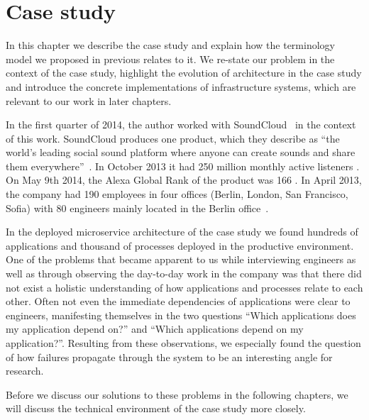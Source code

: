 
\chapter{Case study}
\label{chapter:case_study}

In this chapter we describe the case study and explain how the terminology model we proposed in previous  relates to it. We re-state our problem in the context of the case study, highlight the evolution of architecture in the case study and introduce the concrete implementations of infrastructure systems, which are relevant to our work in later chapters.

In the first quarter of 2014, the author worked with SoundCloud~\cite{soundcloud} in the context of this work. SoundCloud produces one product, which they describe as ``the world’s leading social sound platform where anyone can create sounds and share them everywhere''~\cite{soundcloudabout}. In October 2013 it had 250 million monthly active listeners \cite{soundcloudusers}. On May 9th 2014, the Alexa Global Rank of the product was 166 \cite{alexasoundcloud}. In April 2013, the company had 190 employees in four offices (Berlin, London, San Francisco, Sofia) with 80 engineers mainly located in the Berlin office~\cite{soundcloudAG}.

In the deployed microservice architecture of the case study we found hundreds of applications and thousand of processes deployed in the productive environment.
One of the problems that became apparent to us while interviewing engineers as well as through observing the day-to-day work in the company was that there did not exist a holistic understanding of how applications and processes relate to each other. Often not even the immediate dependencies of applications were clear to engineers, manifesting themselves in the two questions ``Which applications does my application depend on?'' and ``Which applications depend on my application?''. Resulting from these observations, we especially found the question of how failures propagate through the system to be an interesting angle for research.

Before we discuss our solutions to these problems in the following chapters, we will discuss the technical environment of the case study more closely.


